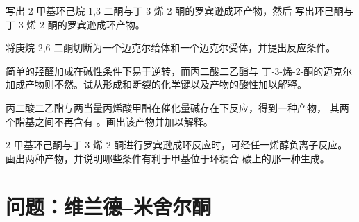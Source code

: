 \begin{exercise}[$\star\star$]\label{exo:b2:conjugate-additions:8}
写出 2-甲基环己烷-1,3-二酮与丁-3-烯-2-酮的罗宾逊成环产物，然后
写出环己酮与丁-3-烯-2-酮的罗宾逊成环产物。
\end{exercise}

\begin{exercise}[$\star\star$]\label{exo:b2:conjugate-additions:9}
将庚烷-2,6-二酮切断为一个迈克尔给体和一个迈克尔受体，并提出反应条件。
\end{exercise}

\begin{exercise}[$\star\star\star$]\label{exo:b2:conjugate-additions:10}
简单的羟醛加成在碱性条件下易于逆转，而丙二酸二乙酯与
丁-3-烯-2-酮的迈克尔加成产物则不然。试从形成和断裂的化学键以及产物的酸性加以解释。
\end{exercise}

\begin{exercise}[$\star\star\star$]\label{exo:b2:conjugate-additions:11}
丙二酸二乙酯与两当量丙烯酸甲酯在催化量碱存在下反应，得到一种产物，
其两个酯基之间不再含有 。画出该产物并加以解释。
\end{exercise}

\begin{exercise}[$\star\star\star$]\label{exo:b2:conjugate-additions:12}
2-甲基环己酮与丁-3-烯-2-酮进行罗宾逊成环反应时，可经任一烯醇负离子反应。
画出两种产物，并说明哪些条件有利于甲基位于环稠合
碳上的那一种生成。
\end{exercise}

\section{问题：维兰德–米舍尔酮}

